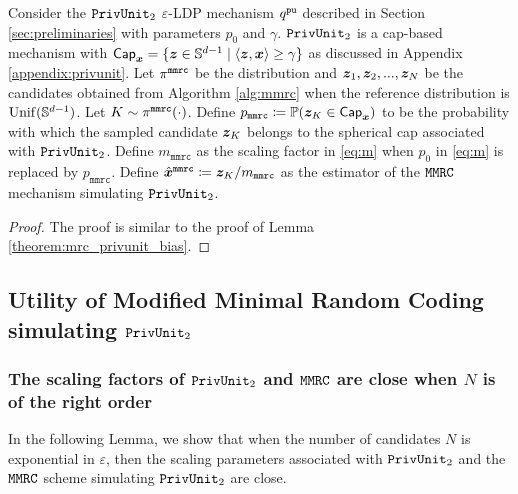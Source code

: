 Consider the $\texttt{PrivUnit}_2$ $\varepsilon$-LDP mechanism $q^{\texttt{pu}}$ described in Section \ref{sec:preliminaries} with parameters $p_0$ and $\gamma$. $\texttt{PrivUnit}_2$ is a cap-based mechanism with $\mathsf{Cap}_{{\boldsymbol{x}}} = \{{\boldsymbol{z}} \in \mathbb{S}^{d-1} \mid
\langle {\boldsymbol{z}}, {\boldsymbol{x}}  \rangle \ge \gamma\}$ as discussed in Appendix \ref{appendix:privunit}. Let $\pi^{\texttt{mmrc}}$ be the distribution and ${\boldsymbol{z}}_1, {\boldsymbol{z}}_2,...,{\boldsymbol{z}}_N$ be the candidates obtained from Algorithm \ref{alg:mmrc} when the reference distribution is $\mathrm{Unif}(\mathbb{S}^{d-1})$. Let  $K \sim \pi^{\texttt{mmrc}}(\cdot)$. Define $p_{\texttt{mmrc}} \coloneqq \mathbb{P}({\boldsymbol{z}}_K \in \mathsf{Cap}_{{\boldsymbol{x}}})$
to be the probability with which the sampled candidate ${\boldsymbol{z}}_K$ belongs to the spherical cap associated with $\texttt{PrivUnit}_2$.
Define $m_{\texttt{mmrc}}$ as the scaling factor in \eqref{eq:m} when $p_0$ in \eqref{eq:m} is replaced by $p_{\texttt{mmrc}}$. Define $\hat{{\boldsymbol{x}}}^\texttt{mmrc} \coloneqq {\boldsymbol{z}}_K / m_\texttt{mmrc}$ as the estimator of the $\texttt{MMRC}$ mechanism simulating $\texttt{PrivUnit}_2$. 
\mmrcprivunitbias*
\begin{proof}
The proof is similar to the proof of Lemma \ref{theorem:mrc_privunit_bias}.
\end{proof}

\subsection{Utility of Modified Minimal Random Coding simulating \texorpdfstring{$\texttt{PrivUnit}_2$}{PrivUnit}}\label{appendix:mmrc_pu_utility}

\subsubsection{The scaling factors of \texorpdfstring{$\texttt{PrivUnit}_2$}{PrivUnit} and \texorpdfstring{$\texttt{MMRC}$}{MMRC} are close when \texorpdfstring{$N$}{N} is of the right order}\label{appendix:scaling_mmrc_pu}
In the following Lemma, we show that when the number of candidates $N$ is exponential in $\varepsilon$, then the scaling parameters associated with $\texttt{PrivUnit}_2$ and the $\texttt{MMRC}$ scheme simulating $\texttt{PrivUnit}_2$ are close.

